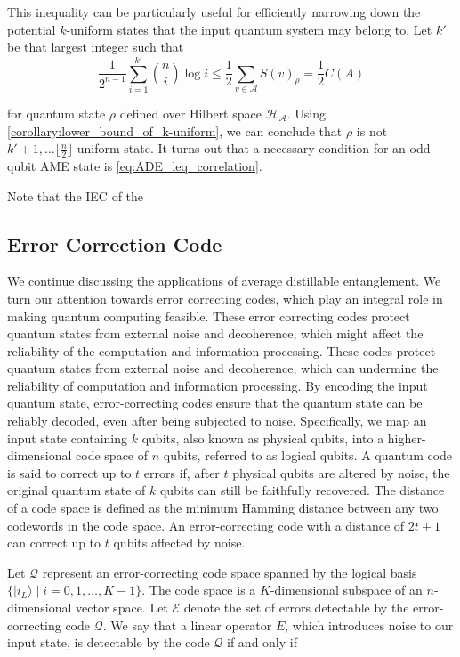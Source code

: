 \documentclass{article}
\newcommand{\ket}[1]{|#1\rangle}
\begin{document}
This inequality can be particularly useful for efficiently narrowing down the potential $k$-uniform states that the input quantum system may belong to. Let $k'$ be that largest integer such that 
\begin{equation}
\frac{1}{2^{n-1}} \sum_{i=1}^{k'} \binom{n}{i} \log i \leq \frac{1}{2} \sum_{v \in \mathcal{A}}  S(v)_{\rho} = \frac{1}{2}C(A)    
\end{equation}


for quantum state $\rho$ defined over Hilbert space $\mathcal{H_A}$. Using \ref{corollary:lower_bound_of_k-uniform}, we can conclude that $\rho$ is not $k'+1, \ldots \lfloor \frac{n}{2} \rfloor$ uniform state. It turns out that a necessary condition for an odd qubit AME state is \ref{eq:ADE_leq_correlation}. 

Note that the IEC of the 

\subsection{Error Correction Code}
We continue discussing the applications of average distillable entanglement. We turn our attention towards error correcting codes, which play an integral role in making quantum computing feasible. These error correcting codes protect quantum states from external noise and decoherence, which might affect the reliability of the computation and information processing. These codes protect quantum states from external noise and decoherence, which can undermine the reliability of computation and information processing. By encoding the input quantum state, error-correcting codes ensure that the quantum state can be reliably decoded, even after being subjected to noise. Specifically, we map an input state containing $k$ qubits, also known as physical qubits, into a higher-dimensional code space of $n$ qubits, referred to as logical qubits. A quantum code is said to correct up to $t$ errors if, after $t$ physical qubits are altered by noise, the original quantum state of $k$ qubits can still be faithfully recovered. The distance of a code space is defined as the minimum Hamming distance between any two codewords in the code space. An error-correcting code with a distance of $2t + 1$ can correct up to $t$ qubits affected by noise.

Let $\mathcal{Q}$ represent an error-correcting code space spanned by the logical basis $\{\ket{i_L} \mid i = 0, 1, \ldots, K-1\}$. The code space is a $K$-dimensional subspace of an $n$-dimensional vector space. Let $\mathcal{E}$ denote the set of errors detectable by the error-correcting code $\mathcal{Q}$. We say that a linear operator $E$, which introduces noise to our input state, is detectable by the code $\mathcal{Q}$ if and only if 
\end{document}
